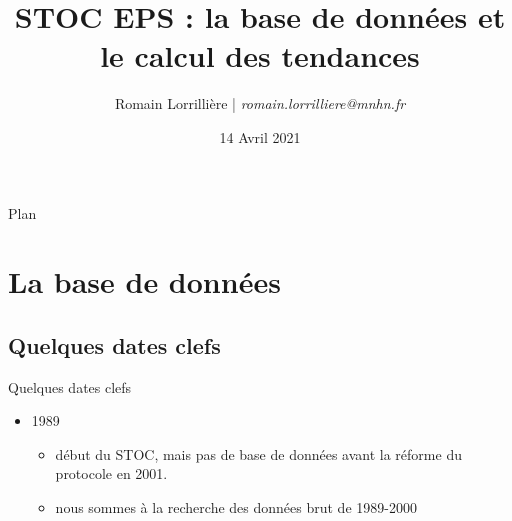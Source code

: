\message{ !name(STOC_romain.tex)}\documentclass[]{beamer}
\title[STOC: DB et tendances]{STOC EPS : la base de données et le
  calcul des tendances}
\author{Romain Lorrillière | \textit{romain.lorrilliere@mnhn.fr}}
\date{14 Avril 2021}
\begin{document}

\maketitle





\begin{frame}{Plan}
  \tableofcontents[pausesections]
\end{frame}




\section{La base de données}

\subsection{Quelques dates clefs}

\begin{frame} {Quelques dates clefs}
  \begin{itemize}
  \item 1989
    \begin{itemize}
    \item début du STOC, mais pas de base de données avant la réforme du
      protocole en 2001.
    \item nous sommes à la recherche des données brut de 1989-2000
      
    \end{itemize}
    
  \end{itemize}
\end{frame}


 
\end{document}
